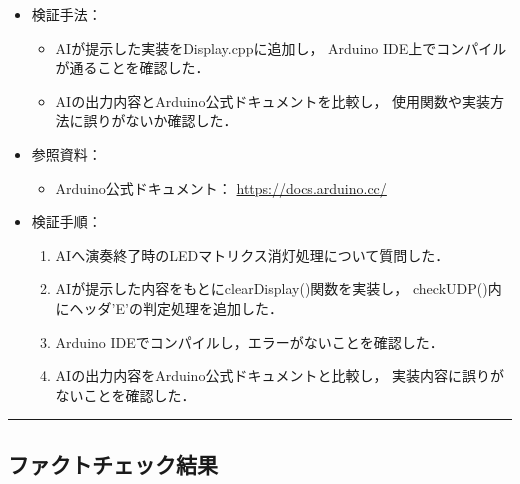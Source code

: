 \documentclass[uplatex,dvipdfmx,a4paper,11pt]{jsarticle}
\newcommand{\sectionrule}{\par\medskip\noindent\rule{\linewidth}{0.6pt}\par\medskip}
\begin{document}
\begin{itemize}

    \item 検証手法：
      \begin{itemize}
        \item AIが提示した実装をDisplay.cppに追加し，
        Arduino IDE上でコンパイルが通ることを確認した．

        \item AIの出力内容とArduino公式ドキュメントを比較し，
        使用関数や実装方法に誤りがないか確認した．
      \end{itemize}

      \item 参照資料：
      \begin{itemize}
        \item Arduino公式ドキュメント：
        \url{https://docs.arduino.cc/}
      \end{itemize}

      \item 検証手順：
    \begin{enumerate}
      \item AIへ演奏終了時のLEDマトリクス消灯処理について質問した．

      \item AIが提示した内容をもとにclearDisplay()関数を実装し，
      checkUDP()内にヘッダ'E'の判定処理を追加した．

      \item Arduino IDEでコンパイルし，エラーがないことを確認した．

      \item AIの出力内容をArduino公式ドキュメントと比較し，
      実装内容に誤りがないことを確認した．
    \end{enumerate}

\end{itemize}

\sectionrule

\subsection{ファクトチェック結果}
\end{document}
